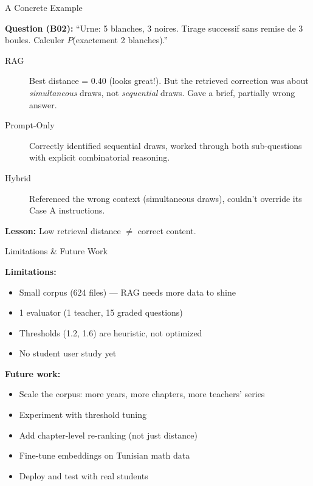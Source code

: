 \documentclass[aspectratio=169, 11pt]{beamer}
\begin{document}
\begin{frame}{A Concrete Example}

\textbf{Question (B02):} ``Urne: 5 blanches, 3 noires. Tirage successif
sans remise de 3 boules. Calculer $P$(exactement 2 blanches).''

\bigskip

\begin{description}
    \item[\textcolor{tumblue}{RAG}] Best distance = 0.40 (looks great!).
        But the retrieved correction was about \textit{simultaneous} draws,
        not \textit{sequential} draws. Gave a brief, partially wrong answer.

    \item[\textcolor{casea}{Prompt-Only}] Correctly identified sequential draws,
        worked through both sub-questions with explicit combinatorial reasoning.

    \item[\textcolor{caseb}{Hybrid}] Referenced the wrong context (simultaneous draws),
        couldn't override its Case A instructions.
\end{description}

\bigskip

\textbf{Lesson:} Low retrieval distance $\neq$ correct content.

\end{frame}


\begin{frame}{Limitations \& Future Work}

\textbf{Limitations:}
\begin{itemize}
    \item Small corpus (624 files) --- RAG needs more data to shine
    \item 1 evaluator (1 teacher, 15 graded questions)
    \item Thresholds (1.2, 1.6) are heuristic, not optimized
    \item No student user study yet
\end{itemize}

\bigskip

\textbf{Future work:}
\begin{itemize}
    \item Scale the corpus: more years, more chapters, more teachers' series
    \item Experiment with threshold tuning
    \item Add chapter-level re-ranking (not just distance)
    \item Fine-tune embeddings on Tunisian math data
    \item Deploy and test with real students
\end{itemize}

\end{frame}
\end{document}
